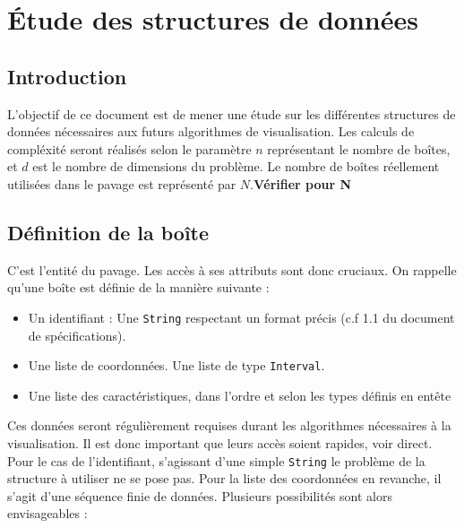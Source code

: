 \chapter{Étude des structures de données}







\section{Introduction}
L'objectif de ce document est de mener une étude sur les différentes structures de données nécessaires aux futurs algorithmes de visualisation. Les calculs de compléxité seront réalisés selon le paramètre $n$  représentant le nombre de boîtes, et $d$ est le nombre de dimensions du problème. Le nombre de boîtes réellement utilisées dans le pavage est représenté par $N$.\textbf{Vérifier pour N}


\section{Définition de la boîte}
C'est l'entité du pavage. Les accès à ses attributs sont donc cruciaux. On rappelle qu'une boîte est définie de la manière suivante : 
\begin{itemize}
\item 
  Un identifiant : Une \verb+String+ respectant un format précis (c.f 1.1 du document de spécifications).
\item
  Une liste de coordonnées. Une liste de type \verb+Interval+.
\item
  Une liste des caractéristiques, dans l'ordre et selon les types définis en entête
\end{itemize}
Ces données seront régulièrement requises durant les algorithmes nécessaires à la visualisation. Il est donc important que leurs accès soient rapides, voir direct. Pour le cas de l'identifiant, s'agissant d'une simple \verb+String+ le problème de la structure à utiliser ne se pose pas. Pour la liste des coordonnées en revanche, il s'agit d'une séquence finie de données. Plusieurs possibilités sont alors envisageables : 

